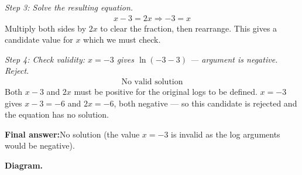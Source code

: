 \documentclass[11pt]{article}
\begin{document}
\textit{Step 3: Solve the resulting equation.}
\[\begin{gathered}
x - 3 = 2x \Rightarrow -3 = x
\end{gathered}\]
Multiply both sides by \( 2x \) to clear the fraction, then rearrange. This gives a candidate value for \( x \) which we must check.

\textit{Step 4: Check validity: \( x = -3 \) gives \( \ln(-3-3) \) --- argument is negative. Reject.}
\[\begin{gathered}
\text{No valid solution}
\end{gathered}\]
Both \( x-3 \) and \( 2x \) must be positive for the original logs to be defined. \( x = -3 \) gives \( x - 3 = -6 \) and \( 2x = -6 \), both negative --- so this candidate is rejected and the equation has no solution.

\begin{answerbox}
\textbf{Final answer:}\quad No solution (the value \(\displaystyle  x = -3 \) is invalid as the log arguments would be negative).
\end{answerbox}
\textbf{Diagram.}
\end{document}
